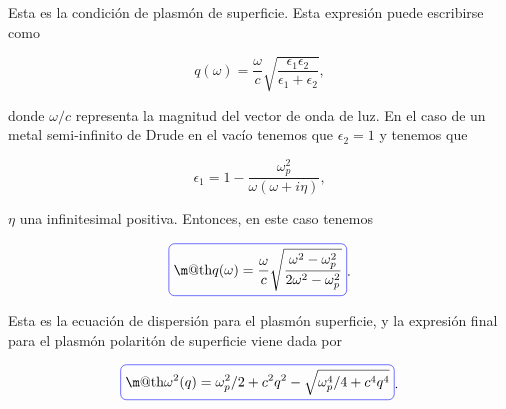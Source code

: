 \documentclass[a4paper,11pt]{article}
\makeatletter
\numberwithin{equation}{section}
\newcommand*{\boxcolor}{blue}
\renewcommand{\boxed}[1]{\textcolor{\boxcolor}{%
\tikz[baseline={([yshift=-1ex]current bounding box.center)}] \node [rectangle, minimum width=1ex,rounded corners,draw] {\normalcolor\m@th$\displaystyle#1$};}}
\makeatother
\begin{document}
Esta es la condición de plasmón de superficie. Esta expresión puede escribirse como 

\begin{equation}
 q(\omega) = \frac{\omega}{c} \sqrt{\frac{\epsilon_1\epsilon_2}{\epsilon_1 + 
 \epsilon_2}},
\end{equation}

donde $\omega/c$ representa la magnitud del vector de onda de luz. En el caso 
de un metal semi-infinito de Drude en el vacío tenemos que $\epsilon_2 = 1$ y 
tenemos que 

\begin{equation}
 \epsilon_1 = 1 - \frac{\omega_p^2}{\omega(\omega + i\eta)},
\end{equation}

$\eta$ una infinitesimal positiva. Entonces, en este caso tenemos 

\begin{equation}
 \boxed{q(\omega) = \frac{\omega}{c}\sqrt{\frac{\omega^2 - \omega_p^2}{2\omega^2 - 
 \omega_p^2}}}.
\end{equation}

Esta es la ecuación de dispersión para el plasmón superficie, y la expresión 
final para el plasmón polaritón de superficie viene dada por 

\begin{equation}
 \boxed{\omega^2(q) = \omega_p^2/2 + c^2q^2 - \sqrt{\omega_p^4/4 + c^4q^4}}.
\end{equation}
\end{document}
